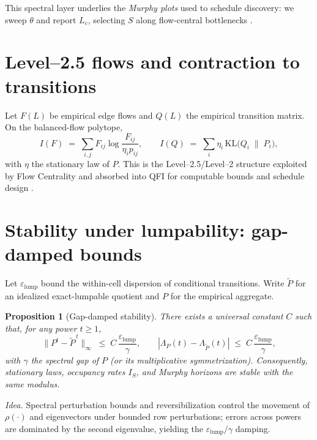 \documentclass[11pt]{article}
\theoremstyle{plain}
\newtheorem{proposition}[theorem]{Proposition}
\theoremstyle{definition}
\theoremstyle{remark}
\newcommand{\1}{\mathbbm{1}}
\newcommand{\KL}{\mathrm{KL}}
\begin{document}
This spectral layer underlies the \emph{Murphy plots} used to schedule discovery: we sweep \(\theta\) and report \(L_c\), selecting \(S\) along flow-central bottlenecks \parencite{elliott2025flow,elliott2025pmb}.

\section{Level–2.5 flows and contraction to transitions}\label{sec:twofive}
Let \(F(L)\) be empirical edge flows and \(Q(L)\) the empirical transition matrix. On the balanced-flow polytope,
\begin{equation}
  I(F)\;=\;\sum_{i,j} F_{ij}\log\frac{F_{ij}}{\eta_i p_{ij}},\qquad
  I(Q)\;=\;\sum_{i}\eta_i\,\KL\!\big(Q_i\;\|\;P_i\big),
\end{equation}
with \(\eta\) the stationary law of \(P\). This is the Level–2.5/Level–2 structure exploited by Flow Centrality and absorbed into QFI for computable bounds and schedule design \parencite{elliott2025flow}.

\section{Stability under lumpability: gap-damped bounds}\label{sec:stability}
Let \(\varepsilon_{\mathrm{lump}}\) bound the within-cell dispersion of conditional transitions. Write \(\tilde P\) for an idealized exact-lumpable quotient and \(P\) for the empirical aggregate.

\begin{proposition}[Gap-damped stability]
There exists a universal constant \(C\) such that, for any power \(t\ge 1\),
\begin{equation}
  \|P^t-\tilde P^{\,t}\|_{\infty}\;\le\;C\,\frac{\varepsilon_{\mathrm{lump}}}{\gamma},\qquad
  |\Lambda_P(t)-\Lambda_{\tilde P}(t)|\;\le\;C\,\frac{\varepsilon_{\mathrm{lump}}}{\gamma},
\end{equation}
with \(\gamma\) the spectral gap of \(P\) (or its multiplicative symmetrization). Consequently, stationary laws, occupancy rates \(I_S\), and Murphy horizons are stable with the same modulus.
\end{proposition}

\noindent\emph{Idea.} Spectral perturbation bounds and reversibilization control the movement of \(\rho(\cdot)\) and eigenvectors under bounded row perturbations; errors across powers are dominated by the second eigenvalue, yielding the \(\varepsilon_{\mathrm{lump}}/\gamma\) damping.
\end{document}
